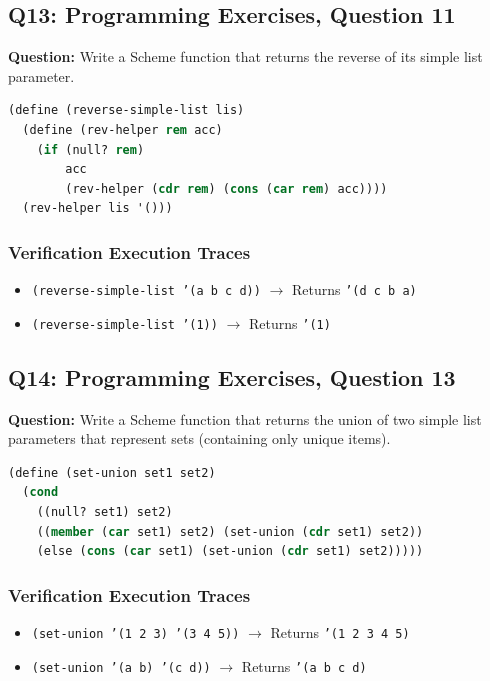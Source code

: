 \documentclass[11pt]{article}
\begin{document}
\subsection{Q13: Programming Exercises, Question 11}
\textbf{Question:} Write a Scheme function that returns the reverse of its simple list parameter.

\begin{lstlisting}[language=Lisp]
(define (reverse-simple-list lis)
  (define (rev-helper rem acc)
    (if (null? rem)
        acc
        (rev-helper (cdr rem) (cons (car rem) acc))))
  (rev-helper lis '()))
\end{lstlisting}

\subsubsection*{Verification Execution Traces}
\begin{itemize}
    \item \texttt{(reverse-simple-list '(a b c d))} $\rightarrow$ Returns \texttt{'(d c b a)}
    \item \texttt{(reverse-simple-list '(1))} $\rightarrow$ Returns \texttt{'(1)}
\end{itemize}

\subsection{Q14: Programming Exercises, Question 13}
\textbf{Question:} Write a Scheme function that returns the union of two simple list parameters that represent sets (containing only unique items).
\begin{lstlisting}[language=Lisp]
(define (set-union set1 set2)
  (cond
    ((null? set1) set2)
    ((member (car set1) set2) (set-union (cdr set1) set2))
    (else (cons (car set1) (set-union (cdr set1) set2)))))
\end{lstlisting}

\subsubsection*{Verification Execution Traces}
\begin{itemize}
    \item \texttt{(set-union '(1 2 3) '(3 4 5))} $\rightarrow$ Returns \texttt{'(1 2 3 4 5)}
    \item \texttt{(set-union '(a b) '(c d))} $\rightarrow$ Returns \texttt{'(a b c d)}
\end{itemize}
\end{document}
